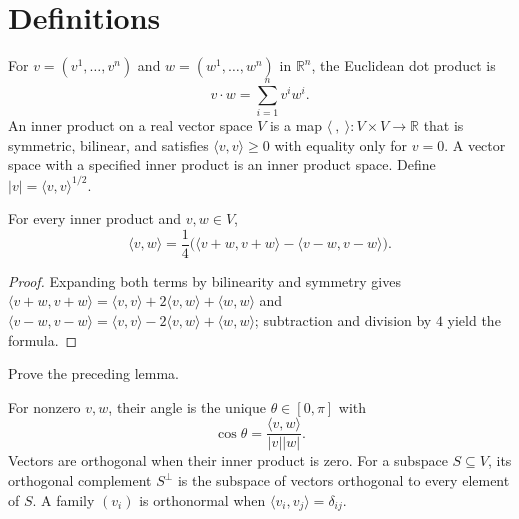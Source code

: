 \section{Definitions}

For $v=(v^1,\ldots,v^n)$ and $w=(w^1,\ldots,w^n)$ in $\mathbb R^n$, the Euclidean dot product is
\[
v\mathbin\cdot w=\sum_{i=1}^n v^i w^i.
\]
An inner product on a real vector space $V$ is a map $\langle\ ,\ \rangle:V\times V\to\mathbb R$ that is symmetric, bilinear, and satisfies $\langle v,v\rangle\ge0$ with equality only for $v=0$. A vector space with a specified inner product is an inner product space. Define $|v|=\langle v,v\rangle^{1/2}$.

\begin{lemma}
\label{lem:polarization-identity}
\leanok
{}
For every inner product and $v,w\in V$,
\[
\langle v,w\rangle=\frac14\bigl(\langle v+w,v+w\rangle-\langle v-w,v-w\rangle\bigr).
\]
\end{lemma}
\begin{proof}
\leanok
\sketch Expanding both terms by bilinearity and symmetry gives $\langle v+w,v+w\rangle=\langle v,v\rangle+2\langle v,w\rangle+\langle w,w\rangle$ and $\langle v-w,v-w\rangle=\langle v,v\rangle-2\langle v,w\rangle+\langle w,w\rangle$; subtraction and division by $4$ yield the formula.
\end{proof}

\begin{exercise}
\label{exer:polarization-proof}
\leanok
{}
Prove the preceding lemma.
\end{exercise}

For nonzero $v,w$, their angle is the unique $\theta\in[0,\pi]$ with
\[
\cos\theta=\frac{\langle v,w\rangle}{|v||w|}.
\]
Vectors are orthogonal when their inner product is zero. For a subspace $S\subseteq V$, its orthogonal complement $S^\perp$ is the subspace of vectors orthogonal to every element of $S$. A family $(v_i)$ is orthonormal when $\langle v_i,v_j\rangle=\delta_{ij}$.

